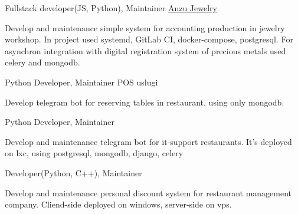 

\begin{cventries}

  \cventry
    {Fullstack developer(JS, Python), Maintainer}
    {\href{https://anzujewelry.com/}{Anzu Jewelry}}
    {} %
    {} %
    {
      \begin{cvitems}
        Develop and maintenance simple system for accounting production in jewelry workshop.
        In project used systemd, GitLab CI, docker-compose, postgresql.
        For asynchron integration with digital registration system of precious metals used celery and mongodb.
      \end{cvitems}
    }

  \cventry
    {Python Developer, Maintainer} %
    {POS uslugi} %
    {} %
    {} %
    {
      \begin{cvitems} %
        Develop telegram bot for reserving tables in restaurant, using only mongodb.
      \end{cvitems}
    }

  \cventry
    {Python Developer, Maintainer} %
    {} %
    {} %
    {} %
    {
      \begin{cvitems} %
        Develop and maintenance telegram bot for it-support restaurants. It's deployed on lxc,
        using postgresql, mongodb, django, celery
      \end{cvitems}
    }

  \cventry
    {Developer(Python, C++), Maintainer} %
    {} %
    {} %
    {} %
    {
      \begin{cvitems} %
        Develop and maintenance personal discount system for restaurant management company.
        Cliend-side deployed on windows, server-side on vps.
      \end{cvitems}
    }


\end{cventries}
